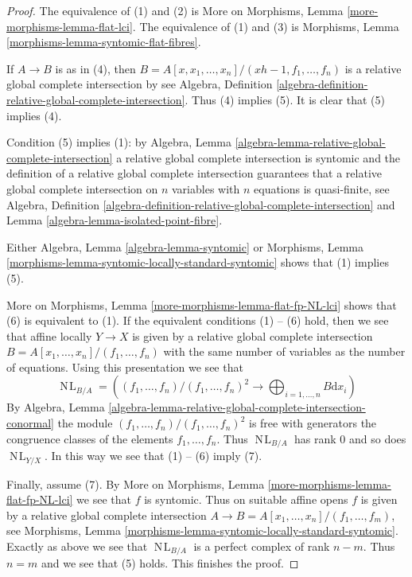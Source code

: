 \documentclass{stacks-project}
\theoremstyle{plain}
\theoremstyle{definition}
\theoremstyle{remark}
\numberwithin{equation}{subsection}
\def\NL{\mathop{N\!L}\nolimits}
\begin{document}
\begin{proof}
The equivalence of (1) and (2) is
More on Morphisms, Lemma \ref{more-morphisms-lemma-flat-lci}.
The equivalence of (1) and (3) is 
Morphisms, Lemma \ref{morphisms-lemma-syntomic-flat-fibres}.

\medskip\noindent
If $A \to B$ is as in (4), then
$B = A[x, x_1, \ldots, x_n]/(xh - 1, f_1, \ldots, f_n)$
is a relative global complete intersection by see Algebra, Definition
\ref{algebra-definition-relative-global-complete-intersection}.
Thus (4) implies (5).
It is clear that (5) implies (4).

\medskip\noindent
Condition (5) implies (1): by
Algebra, Lemma \ref{algebra-lemma-relative-global-complete-intersection}
a relative global complete intersection is syntomic and
the definition of a relative global complete intersection
guarantees that a relative global complete intersection on
$n$ variables with $n$ equations is quasi-finite, see
Algebra, Definition
\ref{algebra-definition-relative-global-complete-intersection} and
Lemma \ref{algebra-lemma-isolated-point-fibre}.

\medskip\noindent
Either Algebra, Lemma \ref{algebra-lemma-syntomic} or
Morphisms, Lemma \ref{morphisms-lemma-syntomic-locally-standard-syntomic}
shows that (1) implies (5).

\medskip\noindent
More on Morphisms, Lemma \ref{more-morphisms-lemma-flat-fp-NL-lci} shows that
(6) is equivalent to (1). If the equivalent conditions (1) -- (6) hold,
then we see that affine locally $Y \to X$ is given by a relative global
complete intersection $B = A[x_1, \ldots, x_n]/(f_1, \ldots, f_n)$
with the same number of variables as the number of
equations. Using this presentation we see that
$$
\NL_{B/A} =\left(
(f_1, \ldots, f_n)/(f_1, \ldots, f_n)^2
\longrightarrow
\bigoplus\nolimits_{i = 1, \ldots, n} B \text{d} x_i\right)
$$
By Algebra, Lemma
\ref{algebra-lemma-relative-global-complete-intersection-conormal}
the module $(f_1, \ldots, f_n)/(f_1, \ldots, f_n)^2$
is free with generators the congruence classes of the elements
$f_1, \ldots, f_n$. Thus $\NL_{B/A}$ has rank $0$ and so does $\NL_{Y/X}$.
In this way we see that (1) -- (6) imply (7).

\medskip\noindent
Finally, assume (7). By
More on Morphisms, Lemma \ref{more-morphisms-lemma-flat-fp-NL-lci}
we see that $f$ is syntomic. Thus on suitable affine opens
$f$ is given by a relative global complete intersection
$A \to B = A[x_1, \ldots, x_n]/(f_1, \ldots, f_m)$, see
Morphisms, Lemma \ref{morphisms-lemma-syntomic-locally-standard-syntomic}.
Exactly as above we see that $\NL_{B/A}$ is a perfect complex
of rank $n - m$. Thus $n = m$ and we see that (5) holds.
This finishes the proof.
\end{proof}
\end{document}
